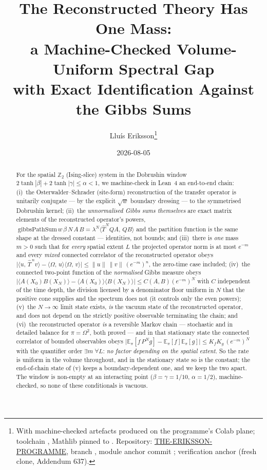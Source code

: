 \documentclass[11pt]{article}
\title{The Reconstructed Theory Has One Mass:\\
a Machine-Checked Volume-Uniform Spectral Gap\\
with Exact Identification Against the Gibbs Sums}
\author{Llu\'is Eriksson\thanks{With machine-checked artefacts produced on
the programme's Colab plane; toolchain \lean{leanprover/lean4:v4.29.0-rc6},
Mathlib pinned to \lean{0764272048\ldots}.  Repository:
\href{https://github.com/lluiseriksson/THE-ERIKSSON-PROGRAMME}{THE-ERIKSSON-PROGRAMME},
branch \lean{d3-closure}, module anchor commit
\lean{7230b97b286775781728952d71720902b6e78073}; verification anchor
\lean{813658de4a1ac5f4365611c444ebf1785ed679cc} (fresh clone, Addendum 637).}}
\date{2026-08-05}
\newcommand{\ip}[2]{\langle #1,\,#2\rangle}
\begin{document}
\maketitle

\begin{abstract}
For the spatial $\mathbb{Z}_2$ (Ising-slice) system in the Dobrushin
window $2\tanh|\beta| + 2\tanh|\gamma| \le \alpha < 1$, we machine-check
in Lean~4 an end-to-end chain: (i)~the Osterwalder--Schrader (site-form)
reconstruction of the transfer operator is unitarily conjugate --- by the
explicit $\sqrt{w}$ boundary dressing --- to the symmetrised Dobrushin
kernel; (ii)~the \emph{unnormalised Gibbs sums themselves} are exact
matrix elements of the reconstructed operator's powers,
$\;\mathrm{gibbsPathSum}\,w\,\beta\,N\,A\,B = \lambda^N
\ip{\hat T^N Q A}{Q B}$ and the partition function is the same shape at
the dressed constant --- identities, not bounds; and (iii)~there is
\emph{one} mass $m>0$ such that for \emph{every} spatial extent $L$ the
projected operator norm is at most $e^{-m}$ and every \emph{mixed}
connected correlator of the reconstructed operator obeys
$\bigl|\ip{u}{\hat T^{\,n} v} - \ip{\Omega}{u}\ip{\Omega}{v}\bigr| \le
\lVert u\rVert\,\lVert v\rVert\,(e^{-m})^n$, the zero-time case
included; (iv)~the connected two-point function of the \emph{normalised}
Gibbs measure obeys $\lvert\langle A(X_0)B(X_N)\rangle -
\langle A(X_0)\rangle\langle B(X_N)\rangle\rvert \le C(A,B)(e^{-m})^N$
with $C$ independent of the time depth, the division licensed by a
denominator floor uniform in $N$ that the positive cone supplies and the
spectrum does not (it controls only the even powers); (v)~the
$N\to\infty$ limit state exists, \emph{is} the vacuum state of the
reconstructed operator, and does not depend on the strictly positive
observable terminating the chain; and (vi)~the reconstructed operator
\emph{is} a reversible Markov chain --- stochastic and in detailed
balance for $\pi = \Omega^2$, both proved --- and in that stationary
state the connected correlator of bounded observables obeys
$\lvert\mathbb{E}_\pi[f\,P^Ng] - \mathbb{E}_\pi[f]\mathbb{E}_\pi[g]\rvert
\le K_fK_g\,(e^{-m})^N$ with the quantifier order
$\exists m\;\forall L$: \emph{no factor depending on the spatial
extent}.  So the rate is uniform in the volume throughout, and in the
stationary state so is the constant; the end-of-chain state of (v) keeps
a boundary-dependent one, and we keep the two apart.  The window is
non-empty at an interacting point ($\beta=\gamma=1/10$, $\alpha=1/2$),
machine-checked, so none of these conditionals is vacuous.

\end{abstract}
\end{document}

